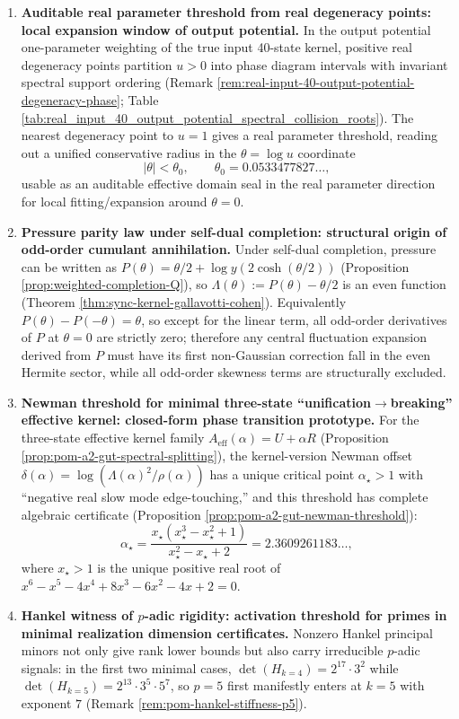 \begin{enumerate}
  \item \textbf{Auditable real parameter threshold from real degeneracy points: local expansion window of output potential.}
  In the output potential one-parameter weighting of the true input 40-state kernel, positive real degeneracy points partition \(u>0\) into phase diagram intervals with invariant spectral support ordering (Remark \ref{rem:real-input-40-output-potential-degeneracy-phase}; Table \ref{tab:real_input_40_output_potential_spectral_collision_roots}).
  The nearest degeneracy point to \(u=1\) gives a real parameter threshold, reading out a unified conservative radius in the \(\theta=\log u\) coordinate
  \[
  |\theta|<\theta_0,\qquad \theta_0=0.0533477827\ldots,
  \]
  usable as an auditable effective domain seal in the real parameter direction for local fitting/expansion around \(\theta=0\).

  \item \textbf{Pressure parity law under self-dual completion: structural origin of odd-order cumulant annihilation.}
  Under self-dual completion, pressure can be written as \(P(\theta)=\theta/2+\log y(2\cosh(\theta/2))\) (Proposition \ref{prop:weighted-completion-Q}), so \(\Lambda(\theta):=P(\theta)-\theta/2\) is an even function (Theorem \ref{thm:sync-kernel-gallavotti-cohen}).
  Equivalently \(P(\theta)-P(-\theta)=\theta\), so except for the linear term, all odd-order derivatives of \(P\) at \(\theta=0\) are strictly zero; therefore any central fluctuation expansion derived from \(P\) must have its first non-Gaussian correction fall in the even Hermite sector, while all odd-order skewness terms are structurally excluded.

  \item \textbf{Newman threshold for minimal three-state ``unification\texorpdfstring{$\to$}{->}breaking'' effective kernel: closed-form phase transition prototype.}
  For the three-state effective kernel family \(A_{\mathrm{eff}}(\alpha)=U+\alpha R\) (Proposition \ref{prop:pom-a2-gut-spectral-splitting}), the kernel-version Newman offset \(\delta(\alpha)=\log(\Lambda(\alpha)^2/\rho(\alpha))\) has a unique critical point \(\alpha_\star>1\) with ``negative real slow mode edge-touching,'' and this threshold has complete algebraic certificate (Proposition \ref{prop:pom-a2-gut-newman-threshold}):
  \[
  \alpha_\star=\frac{x_\star(x_\star^3-x_\star^2+1)}{x_\star^2-x_\star+2}=2.3609261183\ldots,
  \]
  where \(x_\star>1\) is the unique positive real root of \(x^6-x^5-4x^4+8x^3-6x^2-4x+2=0\).

  \item \textbf{Hankel witness of \texorpdfstring{$p$}{p}-adic rigidity: activation threshold for primes in minimal realization dimension certificates.}
  Nonzero Hankel principal minors not only give rank lower bounds but also carry irreducible \(p\)-adic signals: in the first two minimal cases,
  \(
  \det(H_{k=4})=2^{17}\cdot 3^2
  \)
  while
  \(
  \det(H_{k=5})=2^{13}\cdot 3^5\cdot 5^7
  \), so \(p=5\) first manifestly enters at \(k=5\) with exponent \(7\) (Remark \ref{rem:pom-hankel-stiffness-p5}).


\end{enumerate}
